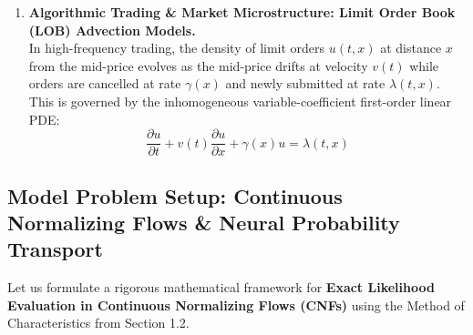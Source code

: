 \documentclass[11pt]{article}
\begin{document}
\begin{enumerate}
    \item \textbf{Algorithmic Trading \& Market Microstructure: Limit Order Book (LOB) Advection Models.} \\
    In high-frequency trading, the density of limit orders $u(t, x)$ at distance $x$ from the mid-price evolves as the mid-price drifts at velocity $v(t)$ while orders are cancelled at rate $\gamma(x)$ and newly submitted at rate $\lambda(t, x)$. This is governed by the inhomogeneous variable-coefficient first-order linear PDE:
    \[
    \frac{\partial u}{\partial t} + v(t)\frac{\partial u}{\partial x} + \gamma(x)u = \lambda(t, x)
    \]
\end{enumerate}

\subsection{Model Problem Setup: Continuous Normalizing Flows \& Neural Probability Transport}
Let us formulate a rigorous mathematical framework for \textbf{Exact Likelihood Evaluation in Continuous Normalizing Flows (CNFs)} using the Method of Characteristics from Section 1.2.
\end{document}
